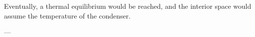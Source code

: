 Eventually, a thermal equilibrium would be reached, and the interior space would assume the temperature of the condenser.

---